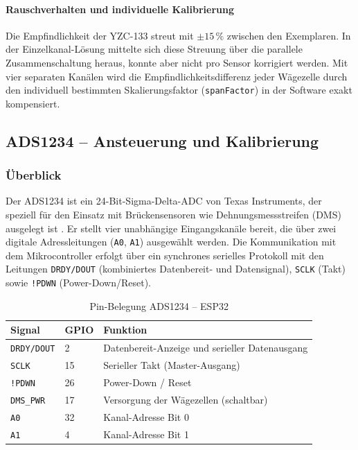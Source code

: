 \documentclass[12pt,a4paper]{article}
\begin{document}
	\paragraph{Rauschverhalten und individuelle Kalibrierung}
	Die Empfindlichkeit der YZC-133 streut mit $\pm 15\,\%$ zwischen den Exemplaren.
	In der Einzelkanal-Lösung mittelte sich diese Streuung über die parallele Zusammenschaltung heraus, konnte aber nicht pro Sensor korrigiert werden.
	Mit vier separaten Kanälen wird die Empfindlichkeitsdifferenz jeder Wägezelle durch den individuell bestimmten Skalierungsfaktor (\texttt{spanFactor}) in der Software exakt kompensiert.


	\subsection{ADS1234 -- Ansteuerung und Kalibrierung}
	\label{sec:kalibrierung}

	\subsubsection{Überblick}

	Der ADS1234 ist ein 24-Bit-Sigma-Delta-ADC von Texas Instruments, der speziell für den Einsatz mit Brückensensoren wie Dehnungsmessstreifen (DMS) ausgelegt ist \cite{ads1234_datasheet}.
	Er stellt vier unabhängige Eingangskanäle bereit, die über zwei digitale Adressleitungen (\texttt{A0}, \texttt{A1}) ausgewählt werden.
	Die Kommunikation mit dem Mikrocontroller erfolgt über ein synchrones serielles Protokoll mit den Leitungen \texttt{DRDY/DOUT} (kombiniertes Datenbereit- und Datensignal), \texttt{SCLK} (Takt) sowie \texttt{!PDWN} (Power-Down/Reset).

	\begin{table}[h]
		\centering
		\caption{Pin-Belegung ADS1234 -- ESP32}
		\begin{tabular}{@{}lll@{}}
			\toprule
			Signal & GPIO & Funktion \\ \midrule
			\texttt{DRDY/DOUT} & 2  & Datenbereit-Anzeige und serieller Datenausgang \\
			\texttt{SCLK}      & 15 & Serieller Takt (Master-Ausgang) \\
			\texttt{!PDWN}      & 26 & Power-Down / Reset \\
			\texttt{DMS\_PWR}  & 17 & Versorgung der Wägezellen (schaltbar) \\
			\texttt{A0}        & 32 & Kanal-Adresse Bit 0 \\
			\texttt{A1}        & 4  & Kanal-Adresse Bit 1 \\ \bottomrule
		\end{tabular}
	\end{table}
\end{document}
